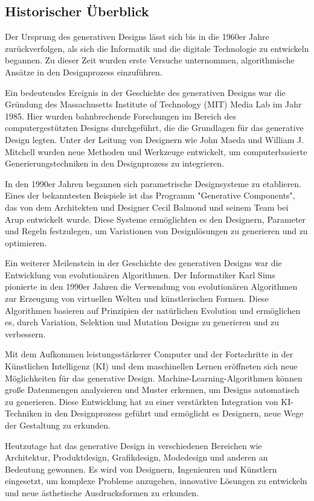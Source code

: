 \subsection*{Historischer Überblick}
Der Ursprung des generativen Designs lässt sich bis in die 1960er Jahre zurückverfolgen, als sich die Informatik und die digitale Technologie zu entwickeln begannen. Zu dieser Zeit wurden erste Versuche unternommen, algorithmische Ansätze in den Designprozess einzuführen.

Ein bedeutendes Ereignis in der Geschichte des generativen Designs war die Gründung des Massachusetts Institute of Technology (MIT) Media Lab im Jahr 1985. Hier wurden bahnbrechende Forschungen im Bereich des computergestützten Designs durchgeführt, die die Grundlagen für das generative Design legten. Unter der Leitung von Designern wie John Maeda und William J. Mitchell wurden neue Methoden und Werkzeuge entwickelt, um computerbasierte Generierungstechniken in den Designprozess zu integrieren.

In den 1990er Jahren begannen sich parametrische Designsysteme zu etablieren. Eines der bekanntesten Beispiele ist das Programm "Generative Components", das von dem Architekten und Designer Cecil Balmond und seinem Team bei Arup entwickelt wurde. Diese Systeme ermöglichten es den Designern, Parameter und Regeln festzulegen, um Variationen von Designlösungen zu generieren und zu optimieren.

Ein weiterer Meilenstein in der Geschichte des generativen Designs war die Entwicklung von evolutionären Algorithmen. Der Informatiker Karl Sims pionierte in den 1990er Jahren die Verwendung von evolutionären Algorithmen zur Erzeugung von virtuellen Welten und künstlerischen Formen. Diese Algorithmen basieren auf Prinzipien der natürlichen Evolution und ermöglichen es, durch Variation, Selektion und Mutation Designs zu generieren und zu verbessern.

Mit dem Aufkommen leistungsstärkerer Computer und der Fortschritte in der Künstlichen Intelligenz (KI) und dem maschinellen Lernen eröffneten sich neue Möglichkeiten für das generative Design. Machine-Learning-Algorithmen können große Datenmengen analysieren und Muster erkennen, um Designs automatisch zu generieren. Diese Entwicklung hat zu einer verstärkten Integration von KI-Techniken in den Designprozess geführt und ermöglicht es Designern, neue Wege der Gestaltung zu erkunden.

Heutzutage hat das generative Design in verschiedenen Bereichen wie Architektur, Produktdesign, Grafikdesign, Modedesign und anderen an Bedeutung gewonnen. Es wird von Designern, Ingenieuren und Künstlern eingesetzt, um komplexe Probleme anzugehen, innovative Lösungen zu entwickeln und neue ästhetische Ausdrucksformen zu erkunden.

